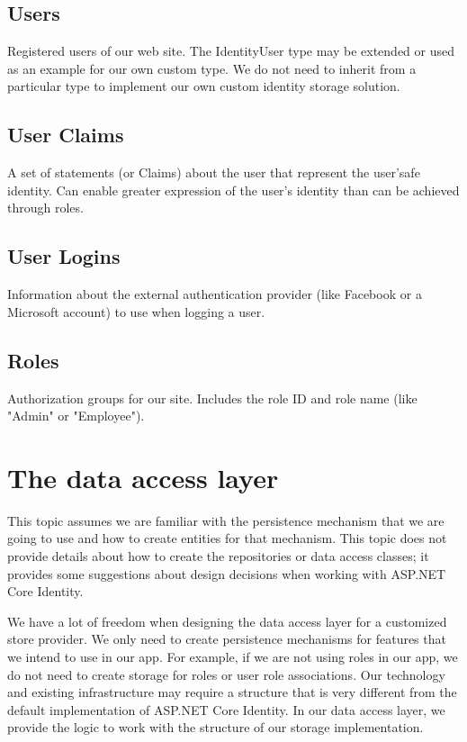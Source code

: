 \documentclass{report}
\begin{document}
    \subsection{Users}
    Registered users of our web site. The IdentityUser type may be extended or
    used as an example for our own custom type. We do not need to inherit from
    a particular type to implement our own custom identity storage solution.

    \subsection{User Claims}
    A set of statements (or Claims) about the user that represent the user'safe
    identity. Can enable greater expression of the user's identity than can be
    achieved through roles.

    \subsection{User Logins}
    Information about the external authentication provider (like Facebook or a
    Microsoft account) to use when logging a user.

    \subsection{Roles}
    Authorization groups for our site. Includes the role ID and role name (like
    "Admin" or "Employee").

    \section{The data access layer}
    This topic assumes we are familiar with the persistence mechanism that we
    are going to use and how to create entities for that mechanism. This topic
    does not provide details about how to create the repositories or data access
    classes; it provides some suggestions about design decisions when working
    with ASP.NET Core Identity.

    We have a lot of freedom when designing the data access layer for a
    customized store provider. We only need to create persistence mechanisms
    for features that we intend to use in our app. For example, if we are not
    using roles in our app, we do not need to create storage for roles or user
    role associations. Our technology and existing infrastructure may require a
    structure that is very different from the default implementation of ASP.NET
    Core Identity. In our data access layer, we provide the logic to work with the
    structure of our storage implementation.
\end{document}
